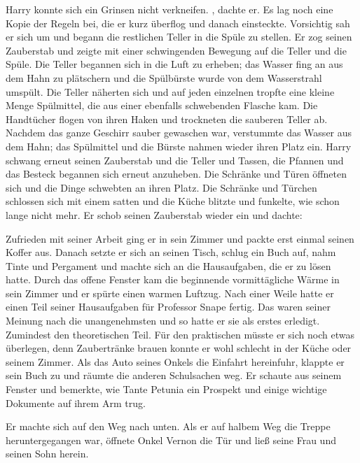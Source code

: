 Harry konnte sich ein Grinsen nicht verkneifen. , dachte er.  Es lag noch eine Kopie der Regeln bei, die er kurz überflog und danach einsteckte. Vorsichtig sah er sich um und begann die restlichen Teller in die Spüle zu stellen. Er zog seinen Zauberstab und zeigte mit einer schwingenden Bewegung auf die Teller und die Spüle. Die Teller begannen sich in die Luft zu erheben; das Wasser fing an aus dem Hahn zu plätschern und die Spülbürste wurde von dem Wasserstrahl umspült. Die Teller näherten sich und auf jeden einzelnen tropfte eine kleine Menge Spülmittel, die aus einer ebenfalls schwebenden Flasche kam. Die Handtücher flogen von ihren Haken und trockneten die sauberen Teller ab. Nachdem das ganze Geschirr sauber gewaschen war, verstummte das Wasser aus dem Hahn; das Spülmittel und die Bürste nahmen wieder ihren Platz ein. Harry schwang erneut seinen Zauberstab und die Teller und Tassen, die Pfannen und das Besteck begannen sich erneut anzuheben. Die Schränke und Türen öffneten sich und die Dinge schwebten an ihren Platz. Die Schränke und Türchen schlossen sich mit einem satten  und die Küche blitzte und funkelte, wie schon lange nicht mehr. Er schob seinen Zauberstab wieder ein und dachte: 

Zufrieden mit seiner Arbeit ging er in sein Zimmer und packte erst einmal seinen Koffer aus. Danach setzte er sich an seinen Tisch, schlug ein Buch auf, nahm Tinte und Pergament und machte sich an die Hausaufgaben, die er zu lösen hatte. Durch das offene Fenster kam die beginnende vormittägliche Wärme in sein Zimmer und er spürte einen warmen Luftzug. Nach einer Weile hatte er einen Teil seiner Hausaufgaben für Professor Snape fertig. Das waren seiner Meinung nach die unangenehmsten und so hatte er sie als erstes erledigt. Zumindest den theoretischen Teil. Für den praktischen müsste er sich noch etwas überlegen, denn Zaubertränke brauen konnte er wohl schlecht in der Küche oder seinem Zimmer. Als das Auto seines Onkels die Einfahrt hereinfuhr, klappte er sein Buch zu und räumte die anderen Schulsachen weg. Er schaute aus seinem Fenster und bemerkte, wie Tante Petunia ein Prospekt und einige wichtige Dokumente auf ihrem Arm trug.

Er machte sich auf den Weg nach unten. Als er auf halbem Weg die Treppe heruntergegangen war, öffnete Onkel Vernon die Tür und ließ seine Frau und seinen Sohn herein. 

